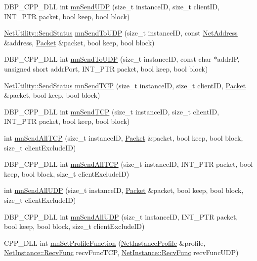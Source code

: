 \begin{DoxyCompactItemize}
\item 
DBP\_\-CPP\_\-DLL int \hyperlink{group__proc_commands_ga4d4196f72fab0f2d1424f63ff5c5ced7}{mnSendUDP} (size\_\-t instanceID, size\_\-t clientID, INT\_\-PTR packet, bool keep, bool block)
\item 
\hyperlink{class_net_utility_a8051eca61204ffd818281419bbf44736}{NetUtility::SendStatus} \hyperlink{group__proc_commands_ga9410455a617d38a8e9bd7ea6a1c1e273}{mnSendToUDP} (size\_\-t instanceID, const \hyperlink{class_net_address}{NetAddress} \&address, \hyperlink{class_packet}{Packet} \&packet, bool keep, bool block)
\item 
DBP\_\-CPP\_\-DLL int \hyperlink{group__proc_commands_ga9904f92dbfda68419dbc86793295579a}{mnSendToUDP} (size\_\-t instanceID, const char $\ast$addrIP, unsigned short addrPort, INT\_\-PTR packet, bool keep, bool block)
\item 
\hyperlink{class_net_utility_a8051eca61204ffd818281419bbf44736}{NetUtility::SendStatus} \hyperlink{group__proc_commands_ga2be055f23f7d82e6f6a7834099652de4}{mnSendTCP} (size\_\-t instanceID, size\_\-t clientID, \hyperlink{class_packet}{Packet} \&packet, bool keep, bool block)
\item 
DBP\_\-CPP\_\-DLL int \hyperlink{group__proc_commands_ga6211caba884ba2710d2b7854b792f4a4}{mnSendTCP} (size\_\-t instanceID, size\_\-t clientID, INT\_\-PTR packet, bool keep, bool block)
\item 
int \hyperlink{group__proc_commands_ga4ae3e56019d3e8706dbcc7660278f0b5}{mnSendAllTCP} (size\_\-t instanceID, \hyperlink{class_packet}{Packet} \&packet, bool keep, bool block, size\_\-t clientExcludeID)
\item 
DBP\_\-CPP\_\-DLL int \hyperlink{group__proc_commands_ga5922467db1c9256df6b6f5a598902b97}{mnSendAllTCP} (size\_\-t instanceID, INT\_\-PTR packet, bool keep, bool block, size\_\-t clientExcludeID)
\item 
int \hyperlink{group__proc_commands_gab5bd7c87f6802d6d246ace6f0bb37163}{mnSendAllUDP} (size\_\-t instanceID, \hyperlink{class_packet}{Packet} \&packet, bool keep, bool block, size\_\-t clientExcludeID)
\item 
DBP\_\-CPP\_\-DLL int \hyperlink{group__proc_commands_ga3e06bdec881534065fc62974bbefd69f}{mnSendAllUDP} (size\_\-t instanceID, INT\_\-PTR packet, bool keep, bool block, size\_\-t clientExcludeID)
\item 
CPP\_\-DLL int \hyperlink{group__proc_commands_gad9602aa0f667ce2cb4e7b7f5cf39b24c}{mnSetProfileFunction} (\hyperlink{class_net_instance_profile}{NetInstanceProfile} \&profile, \hyperlink{class_net_instance_a5a7825b101b3c88c9237d9a8f0134bd5}{NetInstance::RecvFunc} recvFuncTCP, \hyperlink{class_net_instance_a5a7825b101b3c88c9237d9a8f0134bd5}{NetInstance::RecvFunc} recvFuncUDP)

\end{DoxyCompactItemize}
